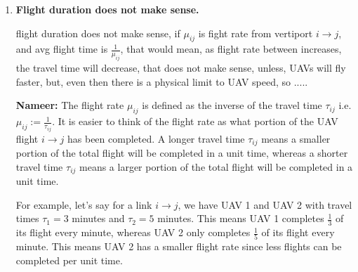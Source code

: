 \documentclass[12pt]{article}
\begin{document}
\begin{enumerate}
    \item \textbf{Flight duration does not make sense.}

    flight duration does not make sense, if $\mu_{ij}$ is fight rate from vertiport $ i \to j $, and avg flight time is $\frac{1}{\mu_{ij}}$, that would mean, as flight rate between increases, the travel time will decrease, that does not make sense, unless, UAVs will fly faster, but, even then there is a physical limit to UAV speed, so ..... 

    \textbf{Nameer:} The flight rate $\mu_{ij}$ is defined as the inverse of the travel time $ \tau_{ij} $ i.e. $\mu_{ij} := \frac{1}{\tau_{ij}}$. It is easier to think of the flight rate as what portion of the UAV flight $i \to j$ has been completed. A longer travel time $\tau_{ij}$ means a smaller portion of the total flight will be completed in a unit time, whereas a shorter travel time $\tau_{ij}$ means a larger portion of the total flight will be completed in a unit time. 

    For example, let's say for a link $i \to j$, we have UAV 1 and UAV 2 with travel times $\tau_1 = 3$ minutes and $\tau_2 = 5$ minutes. This means UAV 1 completes $\frac{1}{3}$ of its flight every minute, whereas UAV 2 only completes $\frac{1}{5}$ of its flight every minute. This means UAV 2 has a smaller flight rate since less flights can be completed per unit time. 

\end{enumerate}
\end{document}
